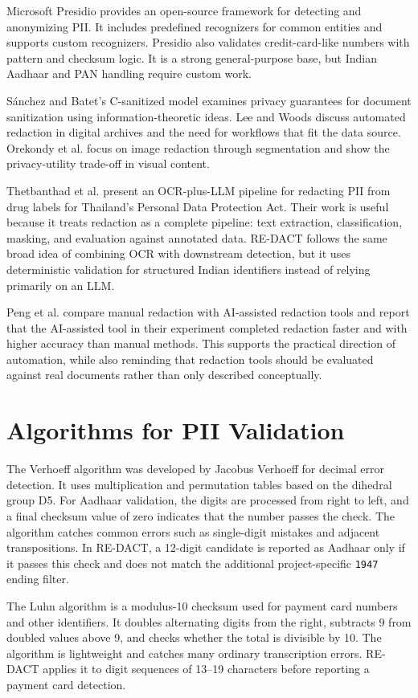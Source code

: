 Microsoft Presidio provides an open-source framework for detecting and anonymizing PII. It includes predefined recognizers for common entities and supports custom recognizers. Presidio also validates credit-card-like numbers with pattern and checksum logic. It is a strong general-purpose base, but Indian Aadhaar and PAN handling require custom work.

S{\'a}nchez and Batet's C-sanitized model examines privacy guarantees for document sanitization using information-theoretic ideas. Lee and Woods discuss automated redaction in digital archives and the need for workflows that fit the data source. Orekondy et al. focus on image redaction through segmentation and show the privacy-utility trade-off in visual content.

Thetbanthad et al. present an OCR-plus-LLM pipeline for redacting PII from drug labels for Thailand's Personal Data Protection Act. Their work is useful because it treats redaction as a complete pipeline: text extraction, classification, masking, and evaluation against annotated data. RE-DACT follows the same broad idea of combining OCR with downstream detection, but it uses deterministic validation for structured Indian identifiers instead of relying primarily on an LLM.

Peng et al. compare manual redaction with AI-assisted redaction tools and report that the AI-assisted tool in their experiment completed redaction faster and with higher accuracy than manual methods. This supports the practical direction of automation, while also reminding that redaction tools should be evaluated against real documents rather than only described conceptually.

\section{Algorithms for PII Validation}

The Verhoeff algorithm was developed by Jacobus Verhoeff for decimal error detection. It uses multiplication and permutation tables based on the dihedral group D5. For Aadhaar validation, the digits are processed from right to left, and a final checksum value of zero indicates that the number passes the check. The algorithm catches common errors such as single-digit mistakes and adjacent transpositions. In RE-DACT, a 12-digit candidate is reported as Aadhaar only if it passes this check and does not match the additional project-specific \texttt{1947} ending filter.

The Luhn algorithm is a modulus-10 checksum used for payment card numbers and other identifiers. It doubles alternating digits from the right, subtracts 9 from doubled values above 9, and checks whether the total is divisible by 10. The algorithm is lightweight and catches many ordinary transcription errors. RE-DACT applies it to digit sequences of 13--19 characters before reporting a payment card detection.

